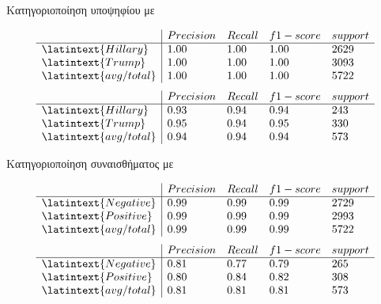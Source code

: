 \documentclass{beamer}
\begin{document}
\begin{frame}
\begin{flushleft}
{\color{blue}Κατηγοριοποίηση υποψηφίου με {}} 
\end{flushleft}
\vfill
{}
\vfill
\[
\left. {\begin{array}{l|llll}
 &Precision & Recall & f1-score & support \\
\hline
{\latintext{Hillary}} & 1.00 & 1.00 & 1.00 & 2629  \\
{\latintext{Trump}} & 1.00 & 1.00 & 1.00 & 3093 \\
{\latintext{avg/total}} & 1.00 & 1.00 & 1.00 & 5722
\end{array} } \right.
\]
{}
\vfill
\[
\left. {\begin{array}{l|llll}
 &Precision & Recall & f1-score & support \\
\hline
{\latintext{Hillary}} & 0.93 & 0.94 & 0.94 & 243  \\
{\latintext{Trump}} & 0.95 & 0.94 & 0.95 & 330 \\
{\latintext{avg/total}} & 0.94 & 0.94 & 0.94 & 573
\end{array} } \right.
\]
\end{frame}

\begin{frame}
\begin{flushleft}
{\color{blue}Κατηγοριοποίηση συναισθήματος με {}} 
\end{flushleft}
\vfill
{}
\vfill
\[
\left. {\begin{array}{l|llll}
 &Precision & Recall & f1-score & support \\
\hline
{\latintext{Negative}} & 0.99 & 0.99 & 0.99 & 2729  \\
{\latintext{Positive}} & 0.99 & 0.99 & 0.99 & 2993 \\
{\latintext{avg/total}} & 0.99 & 0.99 & 0.99 & 5722
\end{array} } \right.
\]
{}
\vfill
\[
\left. {\begin{array}{l|llll}
 &Precision & Recall & f1-score & support \\
\hline
{\latintext{Negative}} & 0.81 & 0.77 & 0.79 & 265  \\
{\latintext{Positive}} & 0.80 & 0.84 & 0.82 & 308 \\
{\latintext{avg/total}} & 0.81 & 0.81 & 0.81 & 573
\end{array} } \right.
\]
\end{frame}
\end{document}
